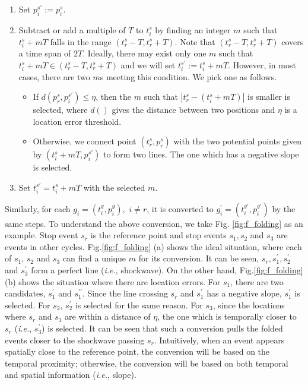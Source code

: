 \documentclass[final,oneside,onecolumn,12pt,a4paper]{book}%
\begin{document}
\begin{enumerate}
\item Set $p_{i}^{s\prime}:=p_{i}^{s}$.

\item Subtract or add a multiple of $T$ to $t_{i}^{s}$ by finding an integer
$m$ such that $t_{i}^{s}+mT$ falls in the range $\left(  t_{r}^{s}-T,t_{r}%
^{s}+T\right)  $. Note that $\left(  t_{r}^{s}-T,t_{r}^{s}+T\right)  $ covers
a time span of $2T$. Ideally, there may exist only one $m$ such that
$t_{i}^{s}+mT\in\left(  t_{r}^{s}-T,t_{r}^{s}+T\right)  $ and we will set
$t_{i}^{s\prime}:=t_{i}^{s}+mT$. However, in most cases, there are two $m$s
meeting this condition. We pick one as follows.

\begin{itemize}
\item If $d\left(  p_{r}^{s},p_{i}^{s\prime}\right)  \leq\eta$, then the $m$
such that $\left\vert t_{r}^{s}-\left(  t_{i}^{s}+mT\right)  \right\vert $ is
smaller is selected, where $d\left(  {}\right)  $ gives the distance between
two positions and $\eta$ is a location error threshold.

\item Otherwise, we connect point $\left(  t_{r}^{s},p_{r}^{s}\right)  $ with
the two potential points given by $\left(  t_{i}^{s}+mT,p_{i}^{s\prime
}\right)  $ to form two lines. The one which has a negative slope is selected.
\end{itemize}

\item Set $t_{i}^{s\prime}=t_{i}^{s}+mT$ with the selected $m$.
\end{enumerate}

Similarly, for each $g_{i}=\left(  t_{i}^{g},p_{i}^{g}\right)  ,$ $i\neq r$,
it is converted to $g_{i}^{\prime}=\left(  t_{i}^{g\prime},p_{i}^{g\prime
}\right)  $ by the same steps. To understand the above conversion, we take
Fig. \ref{fig:f_folding} as an example. Stop event $s_{r}$ is the reference
point and stop events $s_{1},s_{2}$ and $s_{3}$ are events in other cycles.
Fig.\ref{fig:f_folding} (a) shows the ideal situation, where each of $s_{1}$,
$s_{2}$ and $s_{3}$ can find a unique $m$ for its conversion. It can be seen,
$s_{r},s_{1}^{\prime},s_{2}^{\prime}$ and $s_{3}^{\prime}$ form a perfect line
(\textit{i.e.}, shockwave). On the other hand, Fig.\ref{fig:f_folding} (b)
shows the situation where there are location errors. For $s_{1}$, there are
two candidates, $s_{1}^{\prime}$ and $s_{1}^{\prime\prime}$. Since the line
crossing $s_{r}$ and $s_{1}^{\prime}$ has a negative slope, $s_{1}^{\prime}$
is selected. For $s_{2}$, $s_{2}^{\prime}$ is selected for the same reason.
For $s_{3}$, since the locations where $s_{r}$ and $s_{3}$ are within a
distance of $\eta$, the one which is temporally closer to $s_{r}$
(\textit{i.e.}, $s_{3}^{\prime}$) is selected. It can be seen that such a
conversion pulls the folded events closer to the shockwave passing $s_{r}$.
Intuitively, when an event appears spatially close to the reference point, the
conversion will be based on the temporal proximity; otherwise, the conversion
will be based on both temporal and spatial information (\textit{i.e.}, slope).
\end{document}
